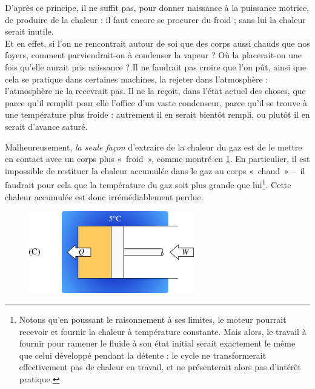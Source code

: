 			D’après ce principe, il ne suffit pas, pour donner naissance à la puissance motrice, de produire de la chaleur : il faut encore se procurer du froid ; sans lui la chaleur serait inutile.\\
			Et en effet, si l’on ne rencontrait autour de soi que des corps aussi chauds que nos foyers, comment parviendrait-on à condenser la vapeur ? Où la placerait-on une fois qu’elle aurait pris naissance ? Il ne faudrait pas croire que l’on pût, ainsi que cela se pratique dans certaines machines, la rejeter dans l’atmosphère : l’atmosphère ne la recevrait pas. Il ne la reçoit, dans l’état actuel des choses, que parce qu’il remplit pour elle l’office d’un vaste condenseur, parce qu’il se trouve à une température plus froide : autrement il en serait bientôt rempli, ou plutôt il en serait d’avance \mbox{saturé}.%

		Malheureusement, \emph{la seule façon} d’extraire de la chaleur du gaz est de le mettre en contact avec un corps plus «~froid~», comme montré en \cref{fig_démo_second_principe_2}. En particulier, il est impossible de restituer la chaleur accumulée dans le gaz au corps «~chaud~» --\ il faudrait pour cela que la température du gaz soit plus grande que lui\footnote{Notons qu’en poussant le raisonnement à ses limites, le moteur pourrait recevoir et fournir la chaleur à température constante. Mais alors, le travail à fournir pour ramener le fluide à son état initial serait exactement le même que celui développé pendant la détente : le cycle ne transformerait effectivement pas de chaleur en travail, et ne présenterait alors pas d’intérêt pratique.}. Cette chaleur accumulée est donc irrémédiablement perdue.

		\begin{figure}
			\begin{center}
				\includegraphics[width=7.2cm]{images/demo_second_principe_2.png}
			\end{center}
			\label{fig_démo_second_principe_2}
		\end{figure}


